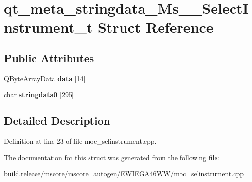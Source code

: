 \hypertarget{structqt__meta__stringdata___ms_____select_instrument__t}{}\section{qt\+\_\+meta\+\_\+stringdata\+\_\+\+Ms\+\_\+\+\_\+\+Select\+Instrument\+\_\+t Struct Reference}
\label{structqt__meta__stringdata___ms_____select_instrument__t}
\subsection*{Public Attributes}
\begin{DoxyCompactItemize}
\item 
\mbox{\label{structqt__meta__stringdata___ms_____select_instrument__t_a29e68ceb5752ecba6a5c35dbcf58130a}} 
Q\+Byte\+Array\+Data {\bfseries data} \mbox{[}14\mbox{]}
\item 
\mbox{\label{structqt__meta__stringdata___ms_____select_instrument__t_a3ce059d9a932529cf7ba2a1389738123}} 
char {\bfseries stringdata0} \mbox{[}295\mbox{]}
\end{DoxyCompactItemize}


\subsection{Detailed Description}


Definition at line 23 of file moc\+\_\+selinstrument.\+cpp.



The documentation for this struct was generated from the following file\+:\begin{DoxyCompactItemize}
\item 
build.\+release/mscore/mscore\+\_\+autogen/\+E\+W\+I\+E\+G\+A46\+W\+W/moc\+\_\+selinstrument.\+cpp\end{DoxyCompactItemize}
